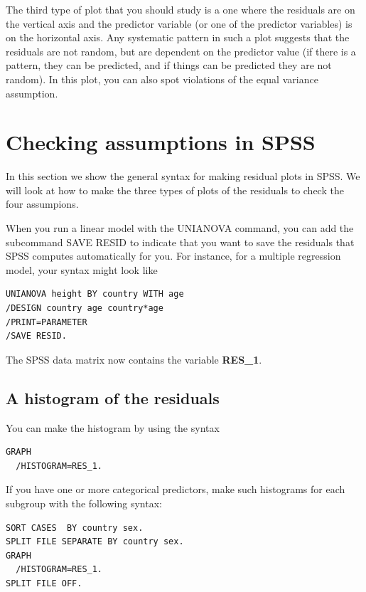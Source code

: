 \documentclass[]{report}\usepackage[]{graphicx}\usepackage[]{color}
\begin{document}
The third type of plot that you should study is a one where the residuals are on the vertical axis and the predictor variable (or one of the predictor variables) is on the horizontal axis. Any systematic pattern in such a plot suggests that the residuals are not random, but are dependent on the predictor value (if there is a pattern, they can be predicted, and if things can be predicted they are not random). In this plot, you can also spot violations of the equal variance assumption. 



\section{Checking assumptions in SPSS}


In this section we show the general syntax for making residual plots in SPSS. We will look at how to make the three types of plots of the residuals to check the four assumpions.


When you run a linear model with the UNIANOVA command, you can add the subcommand SAVE RESID to indicate that you want to save the residuals that SPSS computes automatically for you. For instance, for a multiple regression model, your syntax might look like 

\begin{verbatim}
UNIANOVA height BY country WITH age
/DESIGN country age country*age 
/PRINT=PARAMETER
/SAVE RESID.
\end{verbatim}

The SPSS data matrix now contains the variable \textbf{RES\_1}. 



\subsection{A histogram of the residuals}

You can make the histogram by using the syntax

\begin{verbatim}
GRAPH
  /HISTOGRAM=RES_1.
\end{verbatim}

If you have one or more categorical predictors, make such histograms for each subgroup with the following syntax:

\begin{verbatim}
SORT CASES  BY country sex.
SPLIT FILE SEPARATE BY country sex.
GRAPH
  /HISTOGRAM=RES_1.
SPLIT FILE OFF. 
\end{verbatim}
\end{document}

